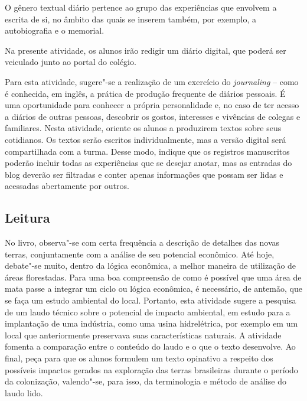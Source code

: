 \documentclass[12pt]{extarticle}
\begin{document}
O gênero textual diário pertence ao grupo das experiências que envolvem
a escrita de si, no âmbito das quais se inserem também, por exemplo, a
autobiografia e o memorial.

Na presente atividade, os alunos irão redigir um diário digital, que
poderá ser veiculado junto ao portal do colégio.

Para esta atividade, sugere"-se a realização de um exercício do
\emph{journaling} -- como é conhecida, em inglês, a prática de produção
frequente de diários pessoais. É uma oportunidade para conhecer a
própria personalidade e, no caso de ter acesso a diários de outras
pessoas, descobrir os gostos, interesses e vivências de colegas e
familiares. Nesta atividade, oriente os alunos a produzirem textos sobre
seus cotidianos. Os textos serão escritos individualmente, mas a versão
digital será compartilhada com a turma. Desse modo, indique que os
registros manuscritos poderão incluir todas as experiências que se
desejar anotar, mas as entradas do blog deverão ser filtradas e conter
apenas informações que possam ser lidas e acessadas abertamente por
outros.

\subsection{Leitura}


No livro, observa"-se com certa frequência a descrição de detalhes das
novas terras, conjuntamente com a análise de seu potencial econômico.
Até hoje, debate"-se muito, dentro da lógica econômica, a melhor maneira
de utilização de áreas florestadas. Para uma boa compreensão de como é
possível que uma área de mata passe a integrar um ciclo ou lógica
econômica, é necessário, de antemão, que se faça um estudo ambiental do
local. Portanto, esta atividade sugere a pesquisa de um laudo técnico
sobre o potencial de impacto ambiental, em estudo para a implantação de
uma indústria, como uma usina hidrelétrica, por exemplo em um local que
anteriormente preservava suas características naturais. A atividade
fomenta a comparação entre o conteúdo do laudo e o que o texto
desenvolve. Ao final, peça para que os alunos formulem um texto
opinativo a respeito dos possíveis impactos gerados na exploração das
terras brasileiras durante o período da colonização, valendo"-se, para
isso, da terminologia e método de análise do laudo lido.

\end{document}
